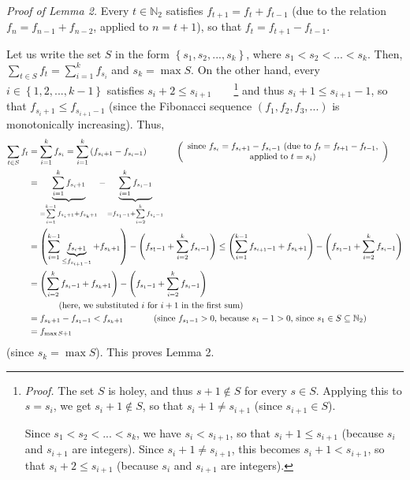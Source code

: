 \documentclass[12pt,final,notitlepage,onecolumn]{article}%
\begin{document}
\textit{Proof of Lemma 2.} Every $t\in\mathbb{N}_{2}$ satisfies $f_{t+1}%
=f_{t}+f_{t-1}$ (due to the relation $f_{n}=f_{n-1}+f_{n-2}$, applied to
$n=t+1$), so that $f_{t}=f_{t+1}-f_{t-1}$.

Let us write the set $S$ in the form $\left\{  s_{1},s_{2},...,s_{k}\right\}
$, where $s_{1}<s_{2}<...<s_{k}$. Then, $\sum\limits_{t\in S}f_{t}%
=\sum\limits_{i=1}^{k}f_{s_{i}}$ and $s_{k}=\max S$. On the other hand, every
$i\in\left\{  1,2,...,k-1\right\}  $ satisfies $s_{i}+2\leq s_{i+1}%
$\ \ \ \ \footnote{\textit{Proof.} The set $S$ is holey, and thus $s+1\notin
S$ for every $s\in S$. Applying this to $s=s_{i}$, we get $s_{i}+1\notin S$,
so that $s_{i}+1\neq s_{i+1}$ (since $s_{i+1}\in S$).
\par
Since $s_{1}<s_{2}<...<s_{k}$, we have $s_{i}<s_{i+1}$, so that $s_{i}+1\leq
s_{i+1}$ (because $s_{i}$ and $s_{i+1}$ are integers). Since $s_{i}+1\neq
s_{i+1}$, this becomes $s_{i}+1<s_{i+1}$, so that $s_{i}+2\leq s_{i+1}$
(because $s_{i}$ and $s_{i+1}$ are integers).} and thus $s_{i}+1\leq
s_{i+1}-1$, so that $f_{s_{i}+1}\leq f_{s_{i+1}-1}$ (since the Fibonacci
sequence $\left(  f_{1},f_{2},f_{3},...\right)  $ is monotonically
increasing). Thus,%
\begin{align*}
\sum\limits_{t\in S}f_{t}  &  =\sum\limits_{i=1}^{k}f_{s_{i}}=\sum
\limits_{i=1}^{k}\left(  f_{s_{i}+1}-f_{s_{i}-1}\right)
\ \ \ \ \ \ \ \ \ \ \left(
\begin{array}
[c]{c}%
\text{since }f_{s_{i}}=f_{s_{i}+1}-f_{s_{i}-1}\text{ (due to }f_{t}%
=f_{t+1}-f_{t-1}\text{,}\\
\text{applied to }t=s_{i}\text{)}%
\end{array}
\right) \\
&  =\underbrace{\sum\limits_{i=1}^{k}f_{s_{i}+1}}_{=\sum\limits_{i=1}%
^{k-1}f_{s_{i}+1}+f_{s_{k}+1}}-\underbrace{\sum\limits_{i=1}^{k}f_{s_{i}-1}%
}_{=f_{s_{1}-1}+\sum\limits_{i=2}^{k}f_{s_{i}-1}}\\
&  =\left(  \sum\limits_{i=1}^{k-1}\underbrace{f_{s_{i}+1}}_{\leq
f_{s_{i+1}-1}}+f_{s_{k}+1}\right)  -\left(  f_{s_{1}-1}+\sum\limits_{i=2}%
^{k}f_{s_{i}-1}\right)  \leq\left(  \sum\limits_{i=1}^{k-1}f_{s_{i+1}%
-1}+f_{s_{k}+1}\right)  -\left(  f_{s_{1}-1}+\sum\limits_{i=2}^{k}f_{s_{i}%
-1}\right) \\
&  =\left(  \sum\limits_{i=2}^{k}f_{s_{i}-1}+f_{s_{k}+1}\right)  -\left(
f_{s_{1}-1}+\sum\limits_{i=2}^{k}f_{s_{i}-1}\right) \\
&  \ \ \ \ \ \ \ \ \ \ \left(  \text{here, we substituted }i\text{ for
}i+1\text{ in the first sum}\right) \\
&  =f_{s_{k}+1}-f_{s_{1}-1}<f_{s_{k}+1}\ \ \ \ \ \ \ \ \ \ \left(  \text{since
}f_{s_{1}-1}>0\text{, because }s_{1}-1>0\text{, since }s_{1}\in S\subseteq
\mathbb{N}_{2}\right) \\
&  =f_{\max S+1}%
\end{align*}
(since $s_{k}=\max S$). This proves Lemma 2.
\end{document}
